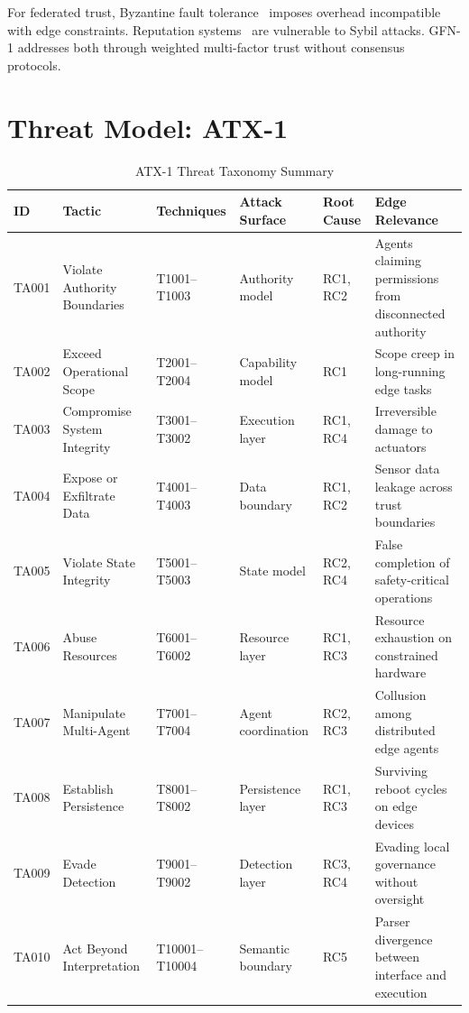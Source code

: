 \documentclass[journal]{IEEEtran}
\begin{document}
For federated trust, Byzantine fault tolerance~\cite{castro1999} imposes overhead incompatible with edge constraints. Reputation systems~\cite{josang2007} are vulnerable to Sybil attacks. GFN-1 addresses both through weighted multi-factor trust without consensus protocols.

\section{Threat Model: ATX-1}

\begin{table}[t]
\centering
\caption{ATX-1 Threat Taxonomy Summary}
\label{tab:atx1}
\begin{tabularx}{\textwidth}{@{}l l l l l >{\raggedright\arraybackslash}X @{}}
\toprule
\textbf{ID} & \textbf{Tactic} & \textbf{Techniques} & \textbf{Attack Surface} & \textbf{Root Cause} & \textbf{Edge Relevance} \\
\midrule
TA001 & Violate Authority Boundaries & T1001--T1003 & Authority model & RC1, RC2 & Agents claiming permissions from disconnected authority \\
TA002 & Exceed Operational Scope & T2001--T2004 & Capability model & RC1 & Scope creep in long-running edge tasks \\
TA003 & Compromise System Integrity & T3001--T3002 & Execution layer & RC1, RC4 & Irreversible damage to actuators \\
TA004 & Expose or Exfiltrate Data & T4001--T4003 & Data boundary & RC1, RC2 & Sensor data leakage across trust boundaries \\
TA005 & Violate State Integrity & T5001--T5003 & State model & RC2, RC4 & False completion of safety-critical operations \\
TA006 & Abuse Resources & T6001--T6002 & Resource layer & RC1, RC3 & Resource exhaustion on constrained hardware \\
TA007 & Manipulate Multi-Agent & T7001--T7004 & Agent coordination & RC2, RC3 & Collusion among distributed edge agents \\
TA008 & Establish Persistence & T8001--T8002 & Persistence layer & RC1, RC3 & Surviving reboot cycles on edge devices \\
TA009 & Evade Detection & T9001--T9002 & Detection layer & RC3, RC4 & Evading local governance without oversight \\
TA010 & Act Beyond Interpretation & T10001--T10004 & Semantic boundary & RC5 & Parser divergence between interface and execution \\
\bottomrule
\end{tabularx}
\end{table}
\end{document}
